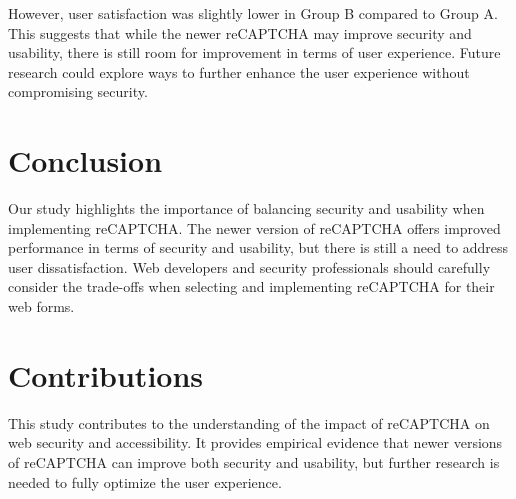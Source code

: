 \documentclass{article}
\begin{document}
However, user satisfaction was slightly lower in Group B compared to Group A. This suggests that while the newer reCAPTCHA may improve security and usability, there is still room for improvement in terms of user experience. Future research could explore ways to further enhance the user experience without compromising security.

\section{Conclusion}
Our study highlights the importance of balancing security and usability when implementing reCAPTCHA. The newer version of reCAPTCHA offers improved performance in terms of security and usability, but there is still a need to address user dissatisfaction. Web developers and security professionals should carefully consider the trade-offs when selecting and implementing reCAPTCHA for their web forms.

\section{Contributions}
This study contributes to the understanding of the impact of reCAPTCHA on web security and accessibility. It provides empirical evidence that newer versions of reCAPTCHA can improve both security and usability, but further research is needed to fully optimize the user experience.



\end{document}
